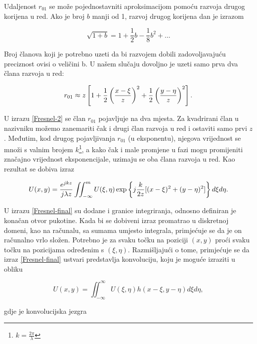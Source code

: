 \documentclass[times, utf8, diplomski, numeric]{fer}
\begin{document}
Udaljenost $r_{01}$ se može pojednostavniti aproksimacijom pomoću razvoja drugog korijena u red. Ako je broj $b$ manji od 1, razvoj drugog korijena dan je izrazom

\begin{equation}
\label{binomial_expansion}
\sqrt{1+b} = 1 + \frac{1}{2}b - \frac{1}{8}b^2 + ...
\end{equation}

Broj članova koji je potrebno uzeti da bi razvojem dobili zadovoljavajuću preciznost ovisi o veličini b. U našem slučaju dovoljno je uzeti samo prva dva člana razvoja u red:

\begin{equation}
\label{approximation_r01}
r_{01} \approx z\left[1+\frac{1}{2}\left(\frac{x-\xi}{z}\right)^2 + \frac{1}{2}\left(\frac{y-\eta}{z}\right)^2\right]\ldotp
\end{equation}

U izrazu \ref{Fresnel-2} se član $r_{01}$ pojavljuje na dva mjesta. Za kvadrirani član u nazivniku možemo zanemariti čak i drugi član razvoja u red i ostaviti samo prvi $z$. Međutim, kod drugog pojavljivanja $r_{01}$ (u eksponentu), njegova vrijednost se množi s valnim brojem $k$\footnote{$k=\frac{2\pi}{\lambda}$}, a kako čak i male promjene u fazi mogu promijeniti značajno vrijednost eksponencijale, uzimaju se oba člana razvoja u red. 
Kao rezultat se dobiva izraz

\begin{equation}
\label{Fresnel-final}
U(x,y) = \frac{e^{jkz}}{j\lambda z}\iint_{-\infty}^{m} U(\xi,\eta)\exp\left\lbrace j\frac{k}{2z}[(x-\xi)^2 + (y - \eta)^2]\right\rbrace d\xi d\eta \ldotp
\end{equation}

U izrazu \ref{Fresnel-final} su dodane i granice integriranja, odnosno definiran je konačan otvor pukotine.
Kada bi se dobiveni izraz promatrao u diskretnoj domeni, kao na računalu, sa sumama umjesto integrala, primjećuje se da je on računalno vrlo složen. Potrebno je za svaku točku na poziciji $(x,y)$ proći svaku točku na pozicijama određenim s $(\xi,\eta)$. Razmišljajući o tome, primjećuje se da izraz \ref{Fresnel-final} ustvari predstavlja konvoluciju, koju je moguće izraziti u obliku


\begin{equation}
\label{Fresnel-conv}
U(x,y) = \iint_{-\infty}^{\infty}U(\xi,\eta)h(x - \xi, y - \eta)d\xi d\eta,
\end{equation}

gdje je konvolucijska jezgra
\end{document}
